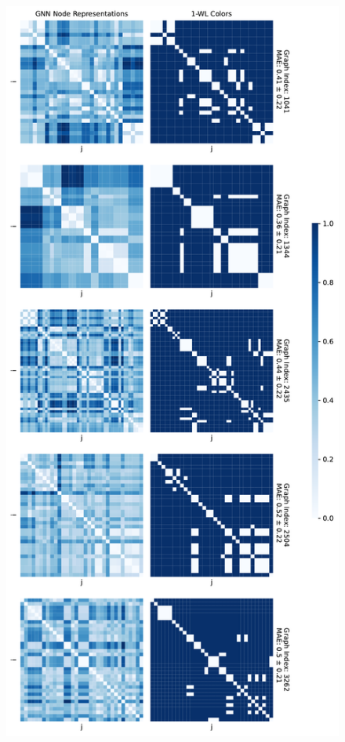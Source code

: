 \begin{figure}[!ht]
\begin{minipage}[b]{0.45992852703\textwidth}
    \end{minipage}
    \hfill
    \begin{minipage}[b]{0.53007147296\textwidth}
        \includegraphics[width=\textwidth, right]{Figures/heatmaps_NCI1_1_k_wl_1.pdf}

\end{minipage}
\end{figure}
